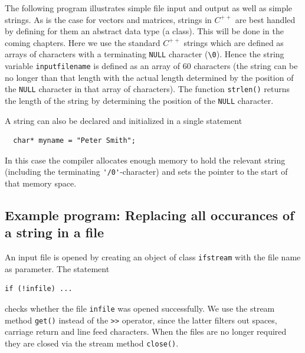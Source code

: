 The following program illustrates simple file input and output as well as simple
strings. As is the case for vectors and matrices, strings in $C^{++}$ are best
handled by defining for them an abstract data type (a class). 
This will be done in the coming chapters. Here we use the standard $C^{++}$ strings
which are defined as arrays of characters with a terminating \verb+NULL+ character
(\verb+\0+).  
Hence the string variable \verb+inputfilename+ is defined as an array of
60 characters (the string can be no longer than that length with the actual length
determined by the position of the \verb+NULL+ character in that array of characters).
The function \verb+strlen()+  returns the length of
the string by determining the position of the \verb+NULL+ character.

A string can also be declared and initialized in a single statement
{\small \begin{verbatim}
  char* myname = "Peter Smith";
\end{verbatim}}
\noindent
In this case the compiler allocates enough memory to hold the relevant string
(including the terminating \verb+'/0'+-character)
 
and sets the pointer  to the start of that memory space.

\subsection{Example program: Replacing all occurances of a string in a file}

\noindent {\small }
\noindent
An input file is opened by creating an object of class \verb+ifstream+
 with
  
 
the file name as parameter. The statement
{\small \begin{verbatim}
if (!infile) ...
\end{verbatim}}
\noindent
checks whether the file \verb+infile+ was opened successfully. We use the stream
method \verb+get()+ instead of the \verb+>>+ operator, since the latter
 
filters out spaces, carriage return and line feed characters.
When the files are no longer required they are closed via the stream method
\verb+close()+. 

